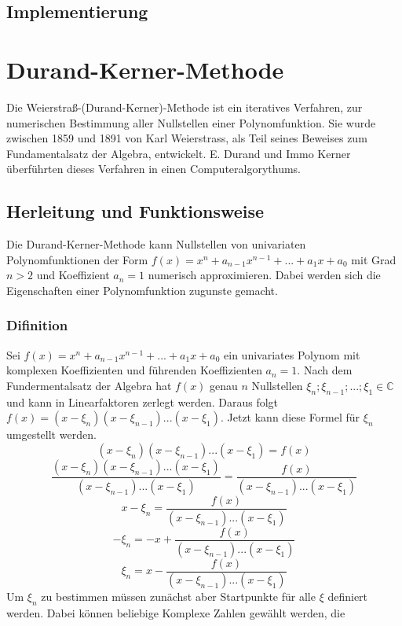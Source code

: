 \documentclass[12pt]{article}
\begin{document}
    \subsection{Implementierung}

\section{Durand-Kerner-Methode} 
    Die Weierstraß-(Durand-Kerner)-Methode ist ein iteratives Verfahren, zur numerischen Bestimmung aller Nullstellen einer Polynomfunktion. Sie wurde zwischen 1859 und 1891 von Karl Weierstrass, als Teil seines Beweises zum Fundamentalsatz der Algebra, entwickelt. E. Durand und Immo Kerner überführten dieses Verfahren in einen Computeralgorythums.

    \subsection{Herleitung und Funktionsweise}
        Die Durand-Kerner-Methode kann Nullstellen von univariaten Polynomfunktionen der Form $f(x) = x^n + a_{n-1} x^{n-1} + ... + a_1 x + a_0$ mit Grad $n > 2$ und Koeffizient $a_n = 1$ numerisch approximieren. Dabei werden sich die Eigenschaften einer Polynomfunktion zugunste gemacht.
    \subsubsection{Difinition}
        Sei $f(x) = x^n + a_{n-1} x^{n-1} + ... + a_1 x + a_0$ ein univariates Polynom mit komplexen Koeffizienten und führenden Koeffizienten $a_n = 1$. Nach dem Fundermentalsatz der Algebra hat $f(x)$ genau $n$ Nullstellen $\xi_n;\xi_{n-1};...;\xi_1 \in \mathbb{C}$ und kann in Linearfaktoren zerlegt werden. Daraus folgt $f(x) = (x - \xi_n)(x - \xi_{n-1})...(x - \xi_1)$. Jetzt kann diese Formel für $\xi_n$ umgestellt werden.
        \begin{displaymath}
            (x - \xi_n)(x - \xi_{n-1})...(x - \xi_1) = f(x)
        \end{displaymath}
        \begin{displaymath}
            \frac{(x - \xi_n)(x - \xi_{n-1})...(x - \xi_1)}{(x - \xi_{n-1})...(x - \xi_1)} = \frac{f(x)}{(x - \xi_{n-1})...(x - \xi_1)}
        \end{displaymath}
        \begin{displaymath}
            x - \xi_n = \frac{f(x)}{(x - \xi_{n-1})...(x - \xi_1)}
        \end{displaymath}
        \begin{displaymath}
            -\xi_n = -x + \frac{f(x)}{(x - \xi_{n-1})...(x - \xi_1)}
        \end{displaymath}
        \begin{displaymath}
            \xi_n = x - \frac{f(x)}{(x - \xi_{n-1})...(x - \xi_1)}
        \end{displaymath}
        Um $\xi_n$ zu bestimmen müssen zunächst aber Startpunkte für alle $\xi$ definiert werden. Dabei können beliebige Komplexe Zahlen gewählt werden, die 
\end{document}
